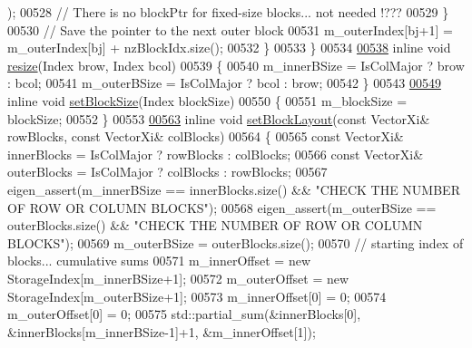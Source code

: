 \begin{DoxyCode}
      );
00528           \textcolor{comment}{// There is no blockPtr for fixed-size blocks... not needed !???}
00529         \}
00530         \textcolor{comment}{// Save the pointer to the next outer block}
00531         m\_outerIndex[bj+1] = m\_outerIndex[bj] + nzBlockIdx.size();
00532       \}
00533     \}
00534 
\hyperlink{group___sparse_core___module_ae0b2c5f1f4aa7a2a54dea00bbcef8e0b}{00538}     \textcolor{keyword}{inline} \textcolor{keywordtype}{void} \hyperlink{group___sparse_core___module_ae0b2c5f1f4aa7a2a54dea00bbcef8e0b}{resize}(Index brow, Index bcol)
00539     \{
00540       m\_innerBSize = IsColMajor ? brow : bcol;
00541       m\_outerBSize = IsColMajor ? bcol : brow;
00542     \}
00543 
\hyperlink{group___sparse_core___module_a1984d81fa41dc2f4e8f1208f602e7e45}{00549}     \textcolor{keyword}{inline} \textcolor{keywordtype}{void} \hyperlink{group___sparse_core___module_a1984d81fa41dc2f4e8f1208f602e7e45}{setBlockSize}(Index blockSize)
00550     \{
00551       m\_blockSize = blockSize;
00552     \}
00553 
\hyperlink{group___sparse_core___module_acad69e4bb5e747db973cacc75c2f4a4d}{00563}     \textcolor{keyword}{inline} \textcolor{keywordtype}{void} \hyperlink{group___sparse_core___module_acad69e4bb5e747db973cacc75c2f4a4d}{setBlockLayout}(\textcolor{keyword}{const} VectorXi& rowBlocks, \textcolor{keyword}{const} VectorXi& colBlocks)
00564     \{
00565       \textcolor{keyword}{const} VectorXi& innerBlocks = IsColMajor ? rowBlocks : colBlocks;
00566       \textcolor{keyword}{const} VectorXi& outerBlocks = IsColMajor ? colBlocks : rowBlocks;
00567       eigen\_assert(m\_innerBSize == innerBlocks.size() && \textcolor{stringliteral}{"CHECK THE NUMBER OF ROW OR COLUMN BLOCKS"});
00568       eigen\_assert(m\_outerBSize == outerBlocks.size() && \textcolor{stringliteral}{"CHECK THE NUMBER OF ROW OR COLUMN BLOCKS"});
00569       m\_outerBSize = outerBlocks.size();
00570       \textcolor{comment}{//  starting index of blocks... cumulative sums}
00571       m\_innerOffset = \textcolor{keyword}{new} StorageIndex[m\_innerBSize+1];
00572       m\_outerOffset = \textcolor{keyword}{new} StorageIndex[m\_outerBSize+1];
00573       m\_innerOffset[0] = 0;
00574       m\_outerOffset[0] = 0;
00575       std::partial\_sum(&innerBlocks[0], &innerBlocks[m\_innerBSize-1]+1, &m\_innerOffset[1]);

\end{DoxyCode}
